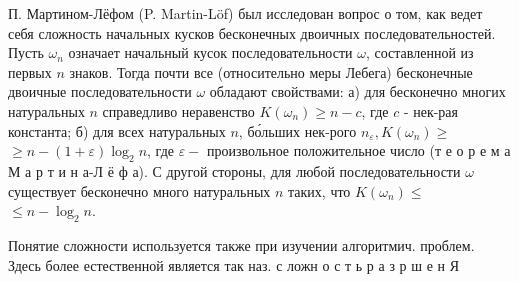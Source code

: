\documentclass[10pt]{article}
\begin{document}
П. Мартином-Лёфом (P. Martin-Löf) был исследован вопрос о том, как ведет себя сложность начальных кусков бесконечных двоичных последовательностей. Пусть $\omega_{n}$ означает начальный кусок последовательности $\omega$, составленной из первых $n$ знаков. Тогда почти все (относительно меры Лебега) бесконечные двоичные последовательности $\omega$ обладают свойствами: а) для бесконечно многих натуральных $n$ справедливо неравенство $K\left(\omega_{n}\right) \geqslant n-c$, где $c$ - нек-рая константа; б) для всех натуральных $n$, бо́льших нек-рого $n_{\varepsilon}, K\left(\omega_{n}\right) \geqslant$ $\geqslant n-(1+\varepsilon) \log _{2} n$, где $\varepsilon-$ произвольное положительное число (т е о р е м а М а р т и н а-Л ё ф а). С другой стороны, для любой последовательности $\omega$ существует бесконечно много натуральных $n$ таких, что $K\left(\omega_{n}\right) \leqslant$ $\leqslant n-\log _{2} n$.



Понятие сложности используется также при изучении алгоритмич. проблем. Здесь более естественной является так наз. с ложн о с т ь р а з р ш е н Я
\end{document}
